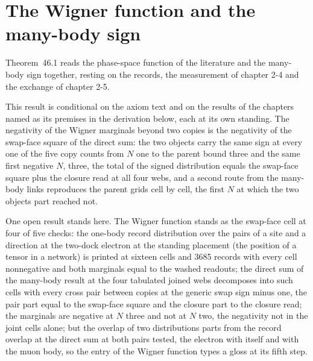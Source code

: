 \par\medskip{}\label{narr:close:2-7}\par
\section{The Wigner function and the many-body sign}\label{mod:II-8-wigner-function-and-the-many-body-sign}
\label{narr:open:2-8}Theorem~46.1 reads the phase-space function of the literature and the many-body sign together, resting on the records, the measurement of chapter 2-4 and the exchange of chapter 2-5.
\begin{chconditional}\label{box:II-8-wigner-function-and-the-many-body-sign:1}
This result is conditional on the axiom text and on the results of the chapters named as its premises in the derivation below, each at its own standing.
The negativity of the Wigner marginals beyond two copies is the negativity of the swap-face square of the direct sum: the two objects carry the same sign at every one of the five copy counts from $N$ one to the parent bound three and the same first negative $N$, three, the total of the signed distribution equals the swap-face square plus the closure read at all four webs, and a second route from the many-body links reproduces the parent grids cell by cell, the first $N$ at which the two objects part reached not.
\end{chconditional}
One open result stands here. The Wigner function stands as the swap-face cell at four of five checks: the one-body record distribution over the pairs of a site and a direction at the two-dock electron at the standing placement (the position of a tensor in a network) is printed at sixteen cells and 3685 records with every cell nonnegative and both marginals equal to the washed readouts; the direct sum of the many-body result at the four tabulated joined webs decomposes into such cells with every cross pair between copies at the generic swap sign minus one, the pair part equal to the swap-face square and the closure part to the closure read; the marginals are negative at $N$ three and not at $N$ two, the negativity not in the joint cells alone; but the overlap of two distributions parts from the record overlap at the direct sum at both pairs tested, the electron with itself and with the muon body, so the entry of the Wigner function types a gloss at its fifth step.
